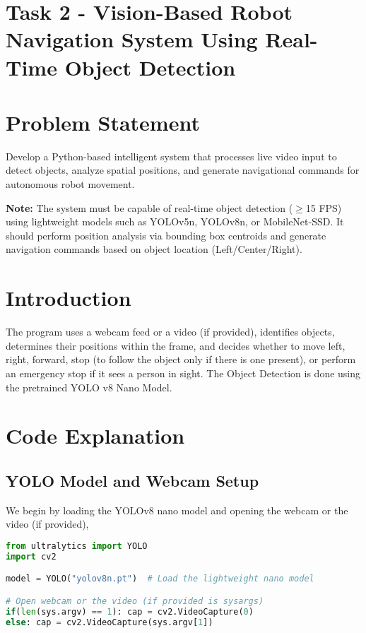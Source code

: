\documentclass[12pt]{article}
\title{}
\author{EE24BTECH11002 Agamjot Singh\\IIT Hyderabad}
\date{\today}
\begin{document}
\section*{Task 2 - Vision-Based Robot Navigation System Using Real-Time Object Detection}

\section*{Problem Statement}

Develop a Python-based intelligent system that processes live video input to detect objects, analyze spatial positions, and generate navigational commands for autonomous robot movement.

\textbf{Note:} The system must be capable of real-time object detection ($\geq$15 FPS) using lightweight models such as YOLOv5n, YOLOv8n, or MobileNet-SSD. It should perform position analysis via bounding box centroids and generate navigation commands based on object location (Left/Center/Right).

\section*{Introduction}
The program uses a webcam feed or a video (if provided), identifies objects, determines their positions within the frame, and decides whether to move left, right, forward, stop (to follow the object only if there is one present), or perform an emergency stop if it sees a person in sight.
\newline
The Object Detection is done using the pretrained YOLO v8 Nano Model.


\section*{Code Explanation}

\subsection*{YOLO Model and Webcam Setup}
We begin by loading the YOLOv8 nano model and opening the webcam or the video (if provided),

\begin{lstlisting}[language=Python]
from ultralytics import YOLO
import cv2

model = YOLO("yolov8n.pt")  # Load the lightweight nano model

# Open webcam or the video (if provided is sysargs)
if(len(sys.argv) == 1): cap = cv2.VideoCapture(0)
else: cap = cv2.VideoCapture(sys.argv[1])
\end{lstlisting}
\end{document}

